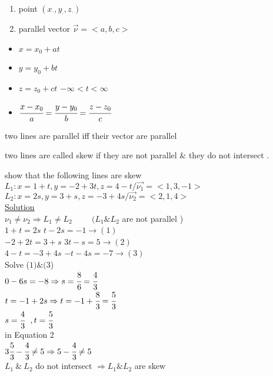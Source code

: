 {} 
\begin{enumerate}
    \item point $(x_\cdot , y_\cdot , z_\cdot )$
    \item  parallel vector $\overrightarrow{\nu} = <a,b,c>$
\end{enumerate}
{} 
\begin{itemize}
    \item $x=x_0 + at$
    \item $y=y_0 + bt$ 
    \item $z=z_0 +ct$ \hspace{1cm}$ -\infty < t < \infty $
\end{itemize}
{} 
\begin{itemize}
    \item $ \cfrac{x-x_0}{a} = \cfrac{y-y_0}{b} = \cfrac{z-z_0}{c}$
\end{itemize} 
\begin{remark}
  two lines are parallel iff their vector are parallel 
\end{remark}
\begin{definition}
 two lines are called skew if they are not parallel $\&$ they do not intersect .
\end{definition}
 \noindent{\color{smalt(darkpowderblue)}\rule{\linewidth}{.2mm}}
\begin{example}
 show that the following lines are skew \\
$L_1 : x = 1+t , y=-2+3t , z=4-t / \overrightarrow{\nu_{1}} = <1,3,-1> $\\
$L_2 : x = 2s , y=3+s , z=-3+4s / \overrightarrow{\nu_{2}} = <2,1,4>$\\
{\color{smalt(darkpowderblue)}\underline{Solution}}\\
$\nu_{1} \neq \nu_{2} \Rightarrow L_{1} \neq L_{2} \hspace{1cm}(L_{1} \& L_2 $ are not parallel )\\
$1+t = 2s $ \hspace{4cm} $t-2s=-1 \rightarrow (1) $\\
$-2+2t = 3+s$ \hspace{3.1cm}$3t-s=5 \rightarrow (2) $\\
$4-t = -3 +4s $\hspace{3.1cm} $-t -4s=-7 \rightarrow (3)$\\
{Solve ($1) \& (3$)} \\
$ 0-6s=-8 \Rightarrow s=\cfrac{8}{6} = \cfrac{4}{3}$\\
$t=-1+2s \Rightarrow t=-1+\cfrac{8}{3} = \cfrac{5}{3}$\\
$s=\cfrac{4}{3} ~~, t=\cfrac{5}{3}$\\
in Equation 2 \\ $ 3\cfrac{5}{3} - \cfrac{4}{3} \neq  5  \Rightarrow 5-\cfrac{4}{3} \neq 5$\\
$L_{1}~ \& ~ L_2$  do not intersect $\Rightarrow L_{1}\& L_2$ are skew \end{example}
